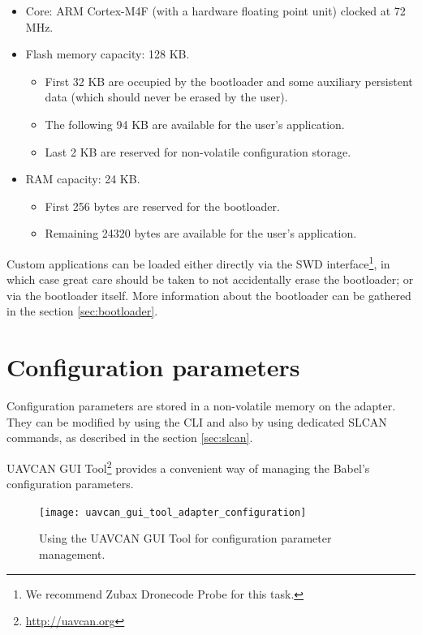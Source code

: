 \documentclass{zubaxdoc}
\begin{document}
\begin{itemize}
    \item Core: ARM Cortex-M4F (with a hardware floating point unit) clocked at 72 MHz.
    \item Flash memory capacity: 128 KB.
    \begin{itemize}
        \item First 32 KB are occupied by the bootloader and some auxiliary persistent data
              (which should never be erased by the user).
        \item The following 94 KB are available for the user's application.
        \item Last 2 KB are reserved for non-volatile configuration storage.
    \end{itemize}
    \item RAM capacity: 24 KB.
    \begin{itemize}
        \item First 256 bytes are reserved for the bootloader.
        \item Remaining 24320 bytes are available for the user's application.
    \end{itemize}
\end{itemize}

Custom applications can be loaded either directly via the
SWD interface\footnote{We recommend Zubax Dronecode Probe for this task.},
in which case great care should be taken to not accidentally erase the bootloader;
or via the bootloader itself.
More information about the bootloader can be gathered in the section \ref{sec:bootloader}.

\chapter{Configuration parameters}\label{sec:configuration_parameters}

Configuration parameters are stored in a non-volatile memory on the adapter.
They can be modified by using the CLI and also by using dedicated SLCAN commands,
as described in the section \ref{sec:slcan}.

UAVCAN GUI Tool\footnote{\url{http://uavcan.org}} provides a convenient way of managing the
Babel's configuration parameters.

\begin{figure}[hbtp]
    \centerline{\texttt{[image: uavcan\_gui\_tool\_adapter\_configuration]}}
    \caption{Using the UAVCAN GUI Tool for configuration parameter management.}
\end{figure}
\end{document}
